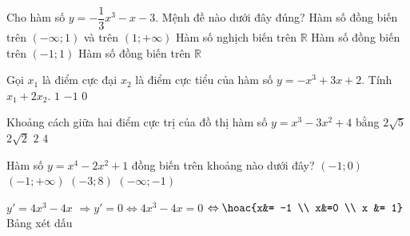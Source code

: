 \begin{ex}
	Cho hàm số $y= - \dfrac{1}{3} x^3 - x -3 $. Mệnh đề nào dưới đây đúng?
	\choice
	{Hàm số đồng biến trên $(-\infty; 1)$ và trên $(1; +\infty)$}
	{\True Hàm số nghịch biến trên $\mathbb{R}$}
	{Hàm số đồng biến trên $(-1;1)$}
	{Hàm số đồng biến trên $\mathbb{R}$}
\end{ex} 


\begin{ex}
	Gọi $x_1$ là điểm cực đại $x_2$ là điểm cực tiểu của hàm số $y=-x^3+3x+2$. Tính $x_1+2x_2$.
	{$1$}
	{\True $-1$}
	{$0$}
\end{ex} 


\begin{ex}
	Khoảng cách giữa hai điểm cực trị của đồ thị hàm số $y=x^3-3x^2+4$ bằng
	\choice
	{\True $2\sqrt{5}$}
	{$2\sqrt{2}$}
	{$2$}
	{$ 4 $}
\end{ex} 

\begin{ex}%
	Hàm số $y=x^4-2x^2+1$ đồng biến trên khoảng nào dưới đây?
	\choice
	{\True $(-1;0)$}
	{$(-1;+ \infty)$}
	{$(-3;8)$}
	{$(- \infty ; -1)$}
	\loigiai
	{
		$y'= 4x^3-4x$ $\Rightarrow y'=0 \Leftrightarrow 4x^3-4x=0$ $\Leftrightarrow \hoac{x&= -1 \\ x&=0 \\ x &= 1}$\\
		Bảng xét dấu
		\begin{center}
		\end{center}
	}
	
\end{ex} 


